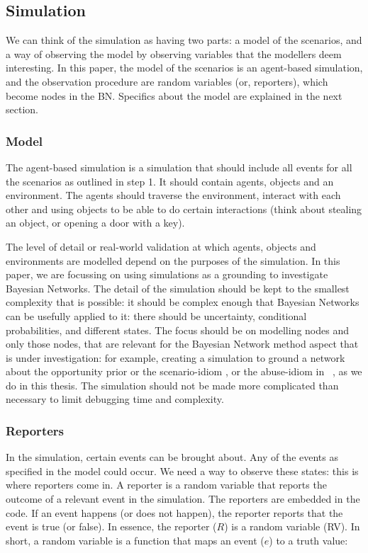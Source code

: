 \documentclass[12pt]{article}
\begin{document}
\subsection{Simulation}
We can think of the simulation as having two parts: a model of the scenarios, and a way of observing the model by observing variables that the modellers deem interesting. In this paper, the model of the scenarios is an agent-based simulation, and the observation procedure are random variables (or, reporters), which become nodes in the BN. Specifics about the model are explained in the next section.

\subsubsection{Model}

The agent-based simulation is a simulation that should include all events for all the scenarios as outlined in step 1. It should contain agents, objects and an environment. The agents should traverse the environment, interact with each other and using objects to be able to do certain interactions (think about stealing an object, or opening a door with a key).

The level of detail or real-world validation at which agents, objects and environments are modelled depend on the purposes of the simulation. In this paper, we are focussing on using simulations as a grounding to investigate Bayesian Networks. The detail of the simulation should be kept to the smallest complexity that is possible: it should be complex enough that Bayesian Networks can be usefully applied to it: there should be uncertainty, conditional probabilities, and different states. The focus should be on modelling nodes and only those nodes, that are relevant for the Bayesian Network method aspect that is under investigation: for example, creating a simulation to ground a network about the opportunity prior \citep{Fenton2017} or the scenario-idiom \citep{vlek2016}, or the abuse-idiom in ~\citet{deZoete2019}, as we do in this thesis. The simulation should not be made more complicated than necessary to limit debugging time and complexity.

\subsubsection{Reporters}

In the simulation, certain events can be brought about. Any of the events as specified in the model could occur. We need a way to observe these states: this is where reporters come in. A reporter is a random variable that reports the outcome of a relevant event in the simulation. The reporters are embedded in the code. If an event happens (or does not happen), the reporter reports that the event is true (or false). In essence, the reporter ($R$) is a random variable (RV). In short, a random variable is a function that maps an event ($e$) to a truth value:
\end{document}
